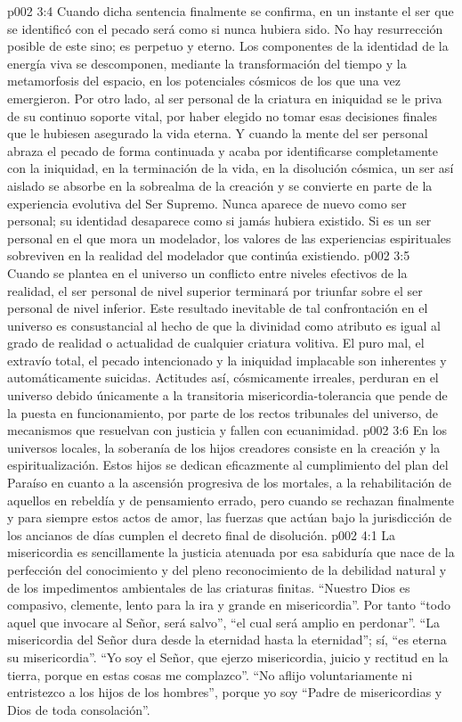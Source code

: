 \vs p002 3:4 Cuando dicha sentencia finalmente se confirma, en un instante el ser que se identificó con el pecado será como si nunca hubiera sido. No hay resurrección posible de este sino; es perpetuo y eterno. Los componentes de la identidad de la energía viva se descomponen, mediante la transformación del tiempo y la metamorfosis del espacio, en los potenciales cósmicos de los que una vez emergieron. Por otro lado, al ser personal de la criatura en iniquidad se le priva de su continuo soporte vital, por haber elegido no tomar esas decisiones finales que le hubiesen asegurado la vida eterna. Y cuando la mente del ser personal abraza el pecado de forma continuada y acaba por identificarse completamente con la iniquidad, en la terminación de la vida, en la disolución cósmica, un ser así aislado se absorbe en la sobrealma de la creación y se convierte en parte de la experiencia evolutiva del Ser Supremo. Nunca aparece de nuevo como ser personal; su identidad desaparece como si jamás hubiera existido. Si es un ser personal en el que mora un modelador, los valores de las experiencias espirituales sobreviven en la realidad del modelador que continúa existiendo.
\vs p002 3:5 \pc Cuando se plantea en el universo un conflicto entre niveles efectivos de la realidad, el ser personal de nivel superior terminará por triunfar sobre el ser personal de nivel inferior. Este resultado inevitable de tal confrontación en el universo es consustancial al hecho de que la divinidad como atributo es igual al grado de realidad o actualidad de cualquier criatura volitiva. El puro mal, el extravío total, el pecado intencionado y la iniquidad implacable son inherentes y automáticamente suicidas. Actitudes así, cósmicamente irreales, perduran en el universo debido únicamente a la transitoria misericordia\hyp{}tolerancia que pende de la puesta en funcionamiento, por parte de los rectos tribunales del universo, de mecanismos que resuelvan con justicia y fallen con ecuanimidad.
\vs p002 3:6 En los universos locales, la soberanía de los hijos creadores consiste en la creación y la espiritualización. Estos hijos se dedican eficazmente al cumplimiento del plan del Paraíso en cuanto a la ascensión progresiva de los mortales, a la rehabilitación de aquellos en rebeldía y de pensamiento errado, pero cuando se rechazan finalmente y para siempre estos actos de amor, las fuerzas que actúan bajo la jurisdicción de los ancianos de días cumplen el decreto final de disolución.
\vs p002 4:1 La misericordia es sencillamente la justicia atenuada por esa sabiduría que nace de la perfección del conocimiento y del pleno reconocimiento de la debilidad natural y de los impedimentos ambientales de las criaturas finitas. “Nuestro Dios es compasivo, clemente, lento para la ira y grande en misericordia”. Por tanto “todo aquel que invocare al Señor, será salvo”, “el cual será amplio en perdonar”. “La misericordia del Señor dura desde la eternidad hasta la eternidad”; sí, “es eterna su misericordia”. “Yo soy el Señor, que ejerzo misericordia, juicio y rectitud en la tierra, porque en estas cosas me complazco”. “No aflijo voluntariamente ni entristezco a los hijos de los hombres”, porque yo soy “Padre de misericordias y Dios de toda consolación”.
